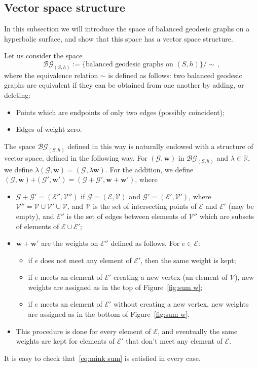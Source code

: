 \documentclass[11pt]{article}
\theoremstyle{definition}
\numberwithin{equation}{section}
\numberwithin{figure}{section}
\numberwithin{table}{section}
\newcommand{\BG}{\mathcal{BG}}
\newcommand{\R}{{\mathbb R}}
\begin{document}
\subsection{Vector space structure}
In this subsection we will introduce the space of balanced geodesic graphs on a hyperbolic surface, and show that this space has a vector space structure.

Let us consider the space
\[
\BG_{(S,h)}:=\{\text{balanced geodesic graphs on }(S,h)\}/\sim\,,
\]
where the equivalence relation $\sim$ is defined as follows: two balanced geodesic graphs are equivalent if they can be obtained from one another by adding, or deleting:
\begin{itemize}
\item Points which are endpoints of only two edges (possibly coincident);
\item Edges of weight zero.
\end{itemize}
The space $\BG_{(S,h)}$ defined in this way is naturally endowed with a structure of vector space, defined in the following way. For $(\mathcal{G},\mathbf w)$ in $\BG_{(S,h)}$ and $\lambda\in \R$, we define $\lambda (\mathcal{G},\mathbf w)=(\mathcal{G},\lambda \mathbf w)$. For the addition, we define $(\mathcal{G},\mathbf w)\textbf{+}(\mathcal{G}',\mathbf w')= (\mathcal{G}+\mathcal{G}',\mathbf w+\mathbf w')$, where
\begin{itemize}
\item $\mathcal{G}+\mathcal{G}'=(\mathcal E'',\mathcal V'')$ if $\mathcal{G}=(\mathcal E,\mathcal V)$ and $\mathcal{G}'=(\mathcal E',\mathcal V')$, where $\mathcal V''=\mathcal V \cup \mathcal V' \cup \bar{\mathcal V}$, and $\bar{\mathcal{V}}$ is the set of intersecting points of $\mathcal E$ and $\mathcal E'$ (may be empty), and $\mathcal E''$ is the set of edges between elements of $\mathcal V''$ which are subsets of elements of $\mathcal E\cup \mathcal E'$;
\item $\mathbf w+\mathbf w'$ are the weights on $\mathcal E''$ defined as follows. For $e\in \mathcal E$:
\begin{itemize}
\item if $e$ does not meet any element of $\mathcal E'$, then the same weight is kept;
\item if $e$ meets an element of $\mathcal E'$ creating a new vertex (an element of $\bar{\mathcal{V}}$), new weights are assigned as in the top of Figure~\ref{fig:sum w};
\item if $e$ meets an element of $\mathcal E'$ without creating a new vertex, new weights are assigned as in the bottom of Figure~\ref{fig:sum w}.
\end{itemize}
\item This procedure is done for every element of $\mathcal E$, and eventually the same weights are kept for elements of $\mathcal E'$ that don't meet any element of $\mathcal E$.
\end{itemize}
It is easy to check that~\eqref{eq:mink sum} is satisfied in every case.
\end{document}
